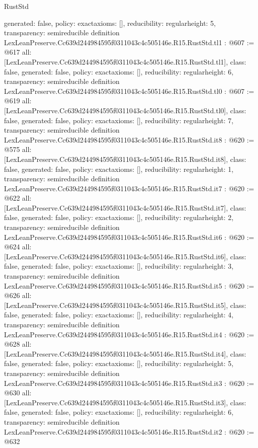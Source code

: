 \begin{lexlean}{RustStd}
\begin{coremodule}
{  generated: false,
  policy: exact{axioms: []},
  reducibility: regular{height: 5},
  transparency: semireducible
}
definition LexLeanPreserve.Cc639d244984595f0311043c4c505146e.R15.RustStd.tl1 : @607 := @617 {
  all: [LexLeanPreserve.Cc639d244984595f0311043c4c505146e.R15.RustStd.tl1],
  class: false,
  generated: false,
  policy: exact{axioms: []},
  reducibility: regular{height: 6},
  transparency: semireducible
}
definition LexLeanPreserve.Cc639d244984595f0311043c4c505146e.R15.RustStd.tl0 : @607 := @619 {
  all: [LexLeanPreserve.Cc639d244984595f0311043c4c505146e.R15.RustStd.tl0],
  class: false,
  generated: false,
  policy: exact{axioms: []},
  reducibility: regular{height: 7},
  transparency: semireducible
}
definition LexLeanPreserve.Cc639d244984595f0311043c4c505146e.R15.RustStd.it8 : @620 := @575 {
  all: [LexLeanPreserve.Cc639d244984595f0311043c4c505146e.R15.RustStd.it8],
  class: false,
  generated: false,
  policy: exact{axioms: []},
  reducibility: regular{height: 1},
  transparency: semireducible
}
definition LexLeanPreserve.Cc639d244984595f0311043c4c505146e.R15.RustStd.it7 : @620 := @622 {
  all: [LexLeanPreserve.Cc639d244984595f0311043c4c505146e.R15.RustStd.it7],
  class: false,
  generated: false,
  policy: exact{axioms: []},
  reducibility: regular{height: 2},
  transparency: semireducible
}
definition LexLeanPreserve.Cc639d244984595f0311043c4c505146e.R15.RustStd.it6 : @620 := @624 {
  all: [LexLeanPreserve.Cc639d244984595f0311043c4c505146e.R15.RustStd.it6],
  class: false,
  generated: false,
  policy: exact{axioms: []},
  reducibility: regular{height: 3},
  transparency: semireducible
}
definition LexLeanPreserve.Cc639d244984595f0311043c4c505146e.R15.RustStd.it5 : @620 := @626 {
  all: [LexLeanPreserve.Cc639d244984595f0311043c4c505146e.R15.RustStd.it5],
  class: false,
  generated: false,
  policy: exact{axioms: []},
  reducibility: regular{height: 4},
  transparency: semireducible
}
definition LexLeanPreserve.Cc639d244984595f0311043c4c505146e.R15.RustStd.it4 : @620 := @628 {
  all: [LexLeanPreserve.Cc639d244984595f0311043c4c505146e.R15.RustStd.it4],
  class: false,
  generated: false,
  policy: exact{axioms: []},
  reducibility: regular{height: 5},
  transparency: semireducible
}
definition LexLeanPreserve.Cc639d244984595f0311043c4c505146e.R15.RustStd.it3 : @620 := @630 {
  all: [LexLeanPreserve.Cc639d244984595f0311043c4c505146e.R15.RustStd.it3],
  class: false,
  generated: false,
  policy: exact{axioms: []},
  reducibility: regular{height: 6},
  transparency: semireducible
}
definition LexLeanPreserve.Cc639d244984595f0311043c4c505146e.R15.RustStd.it2 : @620 := @632 {
}
\end{coremodule}
\end{lexlean}
